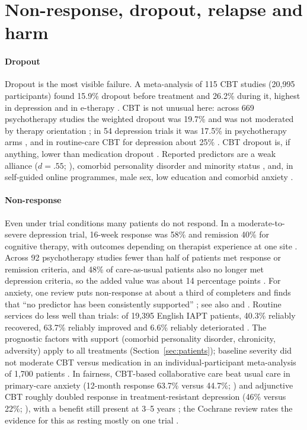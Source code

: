\section{Non-response, dropout, relapse and harm}\label{sec:nonresponse}
\paragraph{Dropout} Dropout is the most visible failure. A meta-analysis of 115 CBT studies (20,995 participants) found 15.9\% dropout before treatment and 26.2\% during it, highest in depression and in e-therapy \citep{Fernandez2015Dropout}. CBT is not unusual here: across 669 psychotherapy studies the weighted dropout was 19.7\% and was not moderated by therapy orientation \citep{Swift2012Premature}; in 54 depression trials it was 17.5\% in psychotherapy arms \citep{Cooper2015DropoutMDD}, and in routine-care CBT for depression about 25\% \citep{Hans2013Depression}. CBT dropout is, if anything, lower than medication dropout \citep{Cuijpers2013Enduring}. Reported predictors are a weak alliance ($d=.55$; \citealp{Sharf2010Alliance}), comorbid personality disorder and minority status \citep{Cooper2015DropoutMDD}, and, in self-guided online programmes, male sex, low education and comorbid anxiety \citep{Karyotaki2015Dropout}.

\paragraph{Non-response} Even under trial conditions many patients do not respond. In a moderate-to-severe depression trial, 16-week response was 58\% and remission 40\% for cognitive therapy, with outcomes depending on therapist experience at one site \citep{DeRubeis2005CT}. Across 92 psychotherapy studies fewer than half of patients met response or remission criteria, and 48\% of care-as-usual patients also no longer met depression criteria, so the added value was about 14 percentage points \citep{Cuijpers2014Remission}. For anxiety, one review puts non-response at about a third of completers and finds that ``no predictor has been consistently supported'' \citep{Taylor2012NonResponse}; see also \citet{loerinc2015response} and \citet{springer2018remission}. Routine services do less well than trials: of 19,395 English IAPT patients, 40.3\% reliably recovered, 63.7\% reliably improved and 6.6\% reliably deteriorated \citep{Gyani2013IAPT}. The prognostic factors with support (comorbid personality disorder, chronicity, adversity) apply to all treatments (Section~\ref{sec:patients}); baseline severity did not moderate CBT versus medication in an individual-participant meta-analysis of 1,700 patients \citep{Weitz2015Severity}. In fairness, CBT-based collaborative care beat usual care in primary-care anxiety (12-month response 63.7\% versus 44.7\%; \citealp{RoyByrne2010CALM}) and adjunctive CBT roughly doubled response in treatment-resistant depression (46\% versus 22\%; \citealp{Wiles2013CoBalT}), with a benefit still present at 3--5 years \citep{Wiles2016CoBalTLong}; the Cochrane review rates the evidence for this as resting mostly on one trial \citep{Ijaz2018TRD}.

